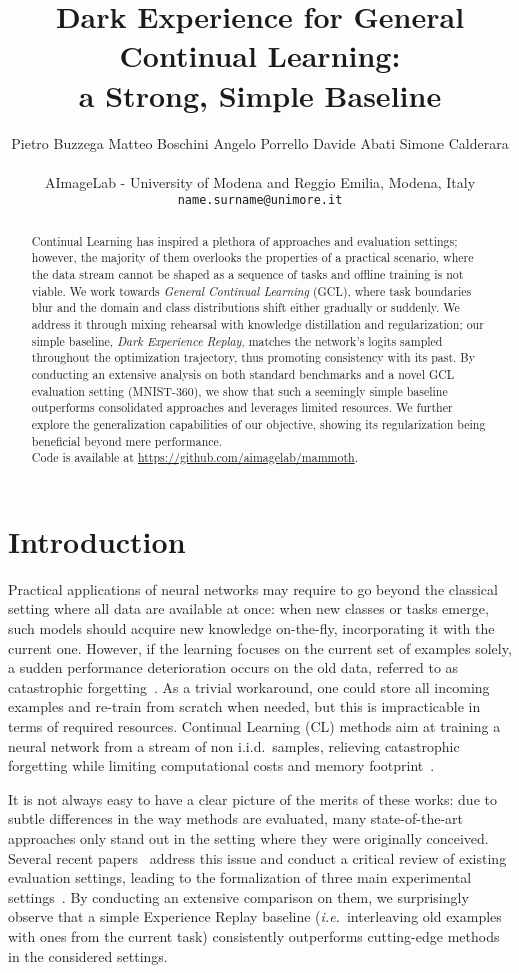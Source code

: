 \documentclass{article}
\title{Dark Experience for General Continual Learning:\\a Strong, Simple Baseline}
\author{
	\hspace{-0.34cm} Pietro Buzzega \hspace{0.35cm} Matteo Boschini \hspace{0.35cm} Angelo Porrello \hspace{0.35cm} Davide Abati \hspace{0.35cm} Simone Calderara\\
	\vspace{0.2cm} \\
	AImageLab - University of Modena and Reggio Emilia, Modena, Italy \\
	\texttt{name.surname@unimore.it} \\
}
\begin{document}
\maketitle
\begin{abstract}
Continual Learning has inspired a plethora of approaches and evaluation settings; however, the majority of them overlooks the properties of a practical scenario, where the data stream cannot be shaped as a sequence of tasks and offline training is not viable. We work towards \textit{General Continual Learning} (GCL), where task boundaries blur and the domain and class distributions shift either gradually or suddenly. We address it through mixing rehearsal with knowledge distillation and regularization; our simple baseline, \textit{Dark Experience Replay}, matches the network's logits sampled throughout the optimization trajectory, thus promoting consistency with its past. By conducting an extensive analysis on both standard benchmarks and a novel GCL evaluation setting (MNIST-360), we show that such a seemingly simple baseline outperforms consolidated approaches and leverages limited resources. We further explore the generalization capabilities of our objective, showing its regularization being beneficial beyond mere performance.\\Code is available at \href{https://github.com/aimagelab/mammoth}{https://github.com/aimagelab/mammoth}.
\end{abstract} \section{Introduction} \label{sec:introduction}
Practical applications of neural networks may require to go beyond the classical setting where all data are available at once: when new classes or tasks emerge, such models should acquire new knowledge on-the-fly, incorporating it with the current one. However, if the learning focuses on the current set of examples solely, a sudden performance deterioration occurs on the old data, referred to as catastrophic forgetting~\cite{mccloskey1989catastrophic}. As a trivial workaround, one could store all incoming examples and re-train from scratch when needed, but this is impracticable in terms of required resources. Continual Learning (CL) methods aim at training a neural network from a stream of non i.i.d.\ samples, relieving catastrophic forgetting while limiting computational costs and memory footprint~\cite{rebuffi2017icarl}.

It is not always easy to have a clear picture of the merits of these works: due to subtle differences in the way methods are evaluated, many state-of-the-art approaches only stand out in the setting where they were originally conceived. Several recent papers~\cite{de2019continual, farquhar2018towards, hsu2018re, van2019three} address this issue and conduct a critical review of existing evaluation settings, leading to the formalization of three main experimental settings~\cite{hsu2018re, van2019three}. By conducting an extensive comparison on them, we surprisingly observe that a simple Experience Replay baseline (\textit{i.e.}\ interleaving old examples with ones from the current task) consistently outperforms cutting-edge methods in the considered settings.
\end{document}
